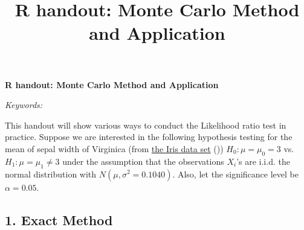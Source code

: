 \documentclass[12pt]{article}
\newcommand{\blind}{}
\begin{document}
\def\spacingset#1{\renewcommand{\baselinestretch}%
{#1}\small\normalsize} \spacingset{1}



\blind
{
  \title{\bf R handout: Monte Carlo Method and Application}

  \author{
      }
  \maketitle
} \fi

\blind
{
  \bigskip
  \bigskip
  \bigskip
  \begin{center}
    {\LARGE\bf R handout: Monte Carlo Method and Application}
  \end{center}
  \medskip
} \fi

\bigskip
\begin{abstract}

\end{abstract}

\noindent%
{\it Keywords:} 
\vfill

\newpage
\spacingset{1.45} %

This handout will show various ways to conduct the Likelihood ratio test
in practice. Suppose we are interested in the following hypothesis
testing for the mean of sepal width of Virginica (from
\href{https://archive.ics.uci.edu/ml/datasets/iris}{the Iris data set}
(\citet{fisher1936use})) \(H_0:\mu = \mu_0 = 3\) vs.
\(H_1: \mu = \mu_1 \ne 3\) under the assumption that the observations
\(X_i\)'s are i.i.d. the normal distribution with
\(N(\mu, \sigma^2 = 0.1040)\). Also, let the significance level be
\(\alpha = 0.05\).

\hypertarget{exact-method}{%
\subsection{1. Exact Method}\label{exact-method}}
\end{document}
